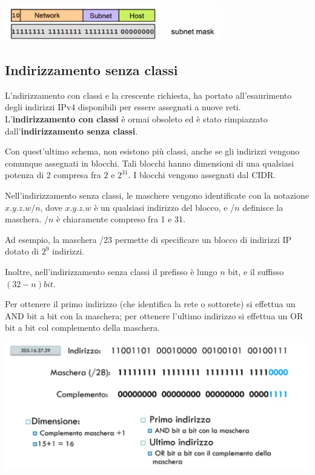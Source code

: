         \begin{center}
            \includegraphics[scale=0.5]{images/Subnet.png}
        \end{center}
        
    \subsection{Indirizzamento senza classi}
    
        L'ndirizzamento con classi e la crescente richiesta, ha portato all'esaurimento degli indirizzi IPv4 disponibili per essere assegnati a nuove reti. L'\textbf{indirizzamento con classi} è ormai obsoleto ed è stato rimpiazzato dall'\textbf{indirizzamento senza classi}.
        
        \vspace{3mm}
        
        Con quest'ultimo schema, non esistono più classi, anche se gli indirizzi vengono comunque assegnati in blocchi. Tali blocchi hanno dimensioni di una qualsiasi potenza di 2 compresa fra $2$ e $2^31$. I blocchi vengono assegnati dal CIDR.
        
        Nell'indirizzamento senza classi, le maschere vengono identificate con la notazione $x.y.z.w/n$, dove $x.y.z.w$ è un qualsiasi indirizzo del blocco, e $/n$ definisce la maschera. $/n$ è chiaramente compreso fra 1 e 31.
        
        Ad esempio, la maschera /23 permette di specificare un blocco di indirizzi IP dotato di $2^9$ indirizzi.
        
        Inoltre, nell'indirizzamento senza classi il prefisso è lungo $n$ bit, e il suffisso $(32-n) bit$.
        
        Per ottenere il primo indirizzo (che identifica la rete o sottorete) si effettua un AND bit a bit con la maschera; per ottenere l'ultimo indirizzo si effettua un OR bit a bit col complemento della maschera.
        
        \begin{center}
            \includegraphics[scale=0.25]{images/EsercizioMaschera.png}
        \end{center}
    
